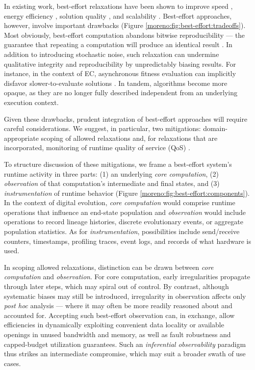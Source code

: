 In existing work, best-effort relaxations have been shown to improve speed \cite{kasap2018dynamic,chakrapani2008probabilistic}, energy efficiency \cite{chakrapani2008probabilistic,bocquet2018memory}, solution quality \cite{rinard2013parallel}, and scalability \cite{meng2009best}.  %
Best-effort approaches, however, involve important drawbacks (Figure \ref{moreno:fig:best-effort:tradeoffs}).
Most obviously, best-effort computation abandons bitwise reproducibility --- the guarantee that repeating a computation will produce an identical result \cite{menon2025reproducibility}.
In addition to introducing stochastic noise, such relaxation can undermine qualitative integrity and reproducibility by unpredictably biasing results.
For instance, in the context of EC, asynchronous fitness evaluation can implicitly disfavor slower-to-evaluate solutions \cite{scott2015understanding,scott2016evaluation,scott2022avoiding,guijt2023impact,karns2025evaluation}.
In tandem, algorithms become more opaque, as they are no longer fully described independent from an underlying execution context.

Given these drawbacks, prudent integration of best-effort approaches will require careful considerations.
We suggest, in particular, two mitigations: domain-appropriate scoping of allowed relaxations and, for relaxations that are incorporated, monitoring of runtime quality of service (QoS) \cite{karakus2017quality}.

To structure discussion of these mitigations, we frame a best-effort system's runtime activity in three parts: (1) an underlying \textit{core computation}, (2) \textit{observation} of that computation's intermediate and final states, and (3) \textit{instrumentation} of runtime behavior (Figure \ref{moreno:fig:best-effort:components}).
In the context of digital evolution, \textit{core computation} would comprise runtime operations that influence an end-state population and \textit{observation} would include operations to record lineage histories, discrete evolutionary events, or aggregate population statistics.
As for \textit{instrumentation}, possibilities include send/receive counters, timestamps, profiling traces, event logs, and records of what hardware is used.

In scoping allowed relaxations, distinction can be drawn between \textit{core computation} and \textit{observation}.
For core computation, early irregularities propagate through later steps, which may spiral out of control.
By contrast, although systematic biases may still be introduced, irregularity in observation affects only \textit{post hoc} analysis --- where it may often be more readily reasoned about and accounted for.
Accepting such best-effort observation can, in exchange, allow efficiencies in dynamically exploiting convenient data locality or available openings in unused bandwidth and memory, as well as fault robustness and capped-budget utilization guarantees.
Such an \textit{inferential observability} paradigm thus strikes an intermediate compromise, which may suit a broader swath of use cases.

